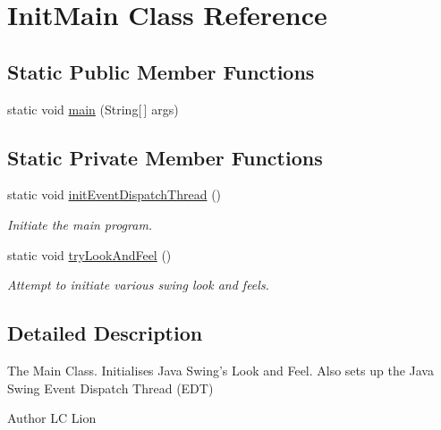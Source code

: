 \hypertarget{classcom_1_1lclion_1_1midigui_1_1_init_main}{\section{Init\+Main Class Reference}
\label{classcom_1_1lclion_1_1midigui_1_1_init_main}
}
\subsection*{Static Public Member Functions}
\begin{DoxyCompactItemize}
\item 
static void \hyperlink{classcom_1_1lclion_1_1midigui_1_1_init_main_a8b260eecbaabcef8473fd87ada040682}{main} (String\mbox{[}$\,$\mbox{]} args)
\end{DoxyCompactItemize}
\subsection*{Static Private Member Functions}
\begin{DoxyCompactItemize}
\item 
static void \hyperlink{classcom_1_1lclion_1_1midigui_1_1_init_main_aeee10cc35bcd0197cf49bc595efc1ea2}{init\+Event\+Dispatch\+Thread} ()
\begin{DoxyCompactList}\small\item\em Initiate the main program. \end{DoxyCompactList}\item 
static void \hyperlink{classcom_1_1lclion_1_1midigui_1_1_init_main_ae9ed8946379ff1f14ef2dab1198a0072}{try\+Look\+And\+Feel} ()
\begin{DoxyCompactList}\small\item\em Attempt to initiate various swing look and feels. \end{DoxyCompactList}\end{DoxyCompactItemize}


\subsection{Detailed Description}
The Main Class. Initialises Java Swing's Look and Feel. Also sets up the Java Swing Event Dispatch Thread (E\+D\+T)

\begin{DoxyAuthor}{Author}
L\+C Lion 
\end{DoxyAuthor}


